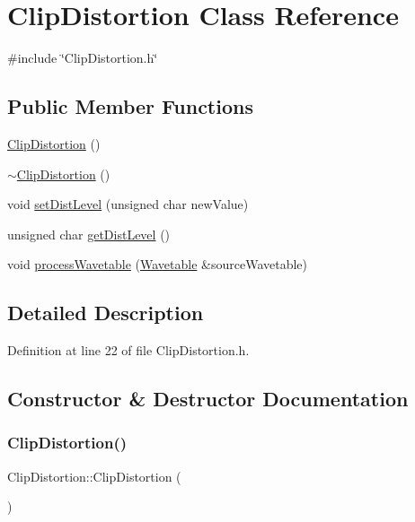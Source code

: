 \hypertarget{class_clip_distortion}{}\section{Clip\+Distortion Class Reference}
\label{class_clip_distortion}


{\ttfamily \#include \char`\"{}Clip\+Distortion.\+h\char`\"{}}

\subsection*{Public Member Functions}
\begin{DoxyCompactItemize}
\item 
\hyperlink{class_clip_distortion_a86506486f99934a97cd2de7cceee3f0d}{Clip\+Distortion} ()
\item 
\hyperlink{class_clip_distortion_a4128fd1ee6344103f10499bd97ab157f}{$\sim$\+Clip\+Distortion} ()
\item 
void \hyperlink{class_clip_distortion_a1fe19163beb22de83c8adff0e6447bc8}{set\+Dist\+Level} (unsigned char new\+Value)
\item 
unsigned char \hyperlink{class_clip_distortion_a2a2656f1baaaa42f9c240040ecee9c68}{get\+Dist\+Level} ()
\item 
void \hyperlink{class_clip_distortion_a761af22fbd15eb8bcc9ac0fdfe4d655d}{process\+Wavetable} (\hyperlink{class_wavetable}{Wavetable} \&source\+Wavetable)
\end{DoxyCompactItemize}


\subsection{Detailed Description}


Definition at line 22 of file Clip\+Distortion.\+h.



\subsection{Constructor \& Destructor Documentation}
\mbox{\label{class_clip_distortion_a86506486f99934a97cd2de7cceee3f0d}} 
\subsubsection{\texorpdfstring{Clip\+Distortion()}{ClipDistortion()}}
{\footnotesize\ttfamily Clip\+Distortion\+::\+Clip\+Distortion (\begin{DoxyParamCaption}{ }\end{DoxyParamCaption})}



